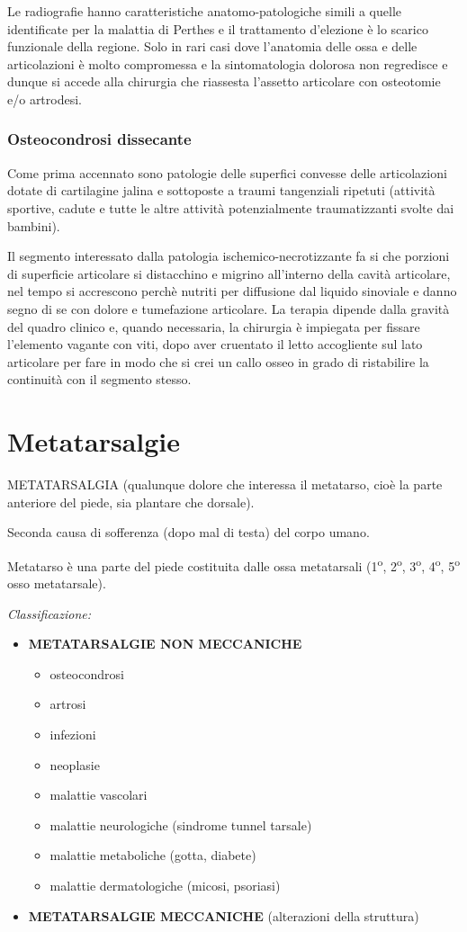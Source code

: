 Le radiografie hanno caratteristiche anatomo-patologiche simili a quelle identificate per la malattia di Perthes e il trattamento d'elezione è lo scarico funzionale della regione. Solo in rari casi dove l'anatomia delle ossa e delle articolazioni è molto compromessa e la sintomatologia dolorosa non regredisce e dunque si accede alla chirurgia che riassesta l'assetto articolare con osteotomie e/o artrodesi.

\subsubsection{Osteocondrosi dissecante}
Come prima accennato sono patologie delle superfici convesse delle articolazioni dotate di cartilagine
jalina e sottoposte a traumi tangenziali ripetuti (attività sportive, cadute e tutte le altre attività potenzialmente traumatizzanti svolte dai bambini).

Il segmento interessato dalla patologia ischemico-necrotizzante fa si che porzioni di superficie articolare si distacchino e migrino all'interno della cavità articolare, nel tempo si accrescono perchè nutriti per diffusione dal liquido sinoviale e danno segno di se con
dolore e tumefazione articolare. La terapia dipende dalla gravità del quadro clinico e, quando necessaria, la chirurgia è impiegata per fissare l'elemento vagante con viti, dopo aver cruentato il letto accogliente sul lato articolare per fare in modo che si crei un callo osseo in grado di ristabilire la continuità con il segmento stesso.

\section{Metatarsalgie}

METATARSALGIA (qualunque dolore che interessa il metatarso, cioè la parte anteriore del piede, sia plantare che dorsale).

Seconda causa di sofferenza (dopo mal di testa) del corpo umano.

Metatarso è una parte del piede costituita dalle ossa metatarsali (1\textsuperscript{o},
2\textsuperscript{o}, 3\textsuperscript{o}, 4\textsuperscript{o}, 5\textsuperscript{o} osso metatarsale).

\emph{Classificazione:}
\begin{itemize}
\item \textbf{METATARSALGIE NON MECCANICHE}
\begin{itemize}
\item
  osteocondrosi
\item
  artrosi
\item
  infezioni
\item
  neoplasie
\item
  malattie vascolari
\item
  malattie neurologiche (sindrome tunnel tarsale)
\item
  malattie metaboliche (gotta, diabete)
\item
  malattie dermatologiche (micosi, psoriasi)
\end{itemize}
\item \textbf{METATARSALGIE MECCANICHE} (alterazioni della struttura)
\end{itemize}

